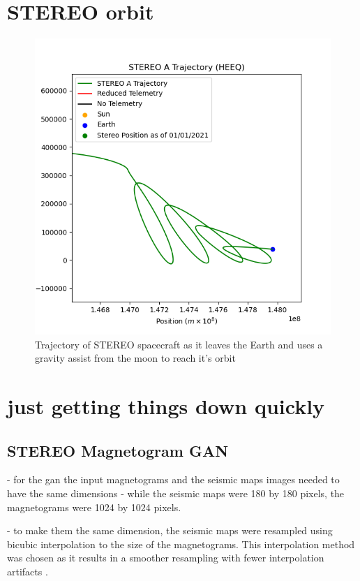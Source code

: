 \documentclass[11pt,a4paper,onecolumn]{report}
\begin{document}
\chapter{STEREO orbit}
\label{app:fun orbit}
\begin{figure}[h]
  \centering
  \includegraphics[width=0.8\linewidth]{fun_orbit.png}
  \caption{Trajectory of STEREO spacecraft as it leaves the Earth and uses a gravity assist from the moon to reach it's orbit}
  \label{fig:fun_orbit}
\end{figure}

\chapter{just getting things down quickly}



\section{STEREO Magnetogram GAN}
- for the gan the input magnetograms and the seismic maps images needed to have
the same dimensions - while the seismic maps were 180 by 180 pixels, the
magnetograms were 1024 by 1024 pixels.




- to make them the same dimension, the seismic maps were resampled using bicubic
interpolation to the size of the magnetograms. This interpolation method was
chosen as it results in a smoother resampling with fewer interpolation artifacts
\citep{keys_cubic_1981}.
\end{document}
